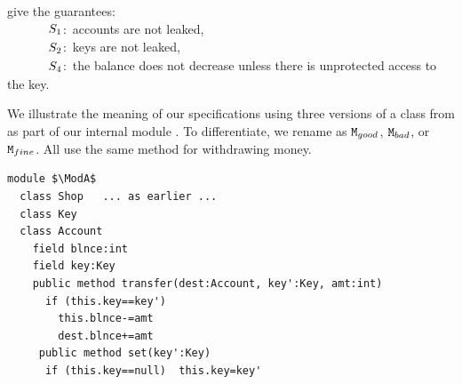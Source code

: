 \noindent
 give the  guarantees:\\
 $\strut  \ \ \ \ \ \ \ \ \ \   S_1$:\   accounts are not leaked, \\
$\strut   \ \ \ \ \ \ \ \ \ \  S_2$:\    keys are not leaked,\\
$\strut \ \ \ \ \ \ \ \ \ \   S_4$:\   the balance does not decrease unless there is unprotected access to the key.  


 
\vspace{.1cm}

\begin{example}
We illustrate the meaning of our specifications  using three  versions of a class   from  \cite{OOPSLA22} 
as part of our internal module \Mshop. 
To differentiate, we rename \Mshop  as $\mbox{\normalfont{\texttt{M}}}_{{good}}$,  $\mbox{\normalfont{\texttt{M}}}_{{bad}}$, or $\mbox{\normalfont{\texttt{M}}}_{{fine}}$. 
All use the same  method for withdrawing money.

%
\begin{lstlisting}[mathescape=true, language=Chainmail, frame=lines]
module $\ModA$      
  class Shop   ... as earlier ...
  class Key
  class Account
    field blnce:int 
    field key:Key
    public method transfer(dest:Account, key':Key, amt:int)
      if (this.key==key')
        this.blnce-=amt
        dest.blnce+=amt
     public method set(key':Key)
      if (this.key==null)  this.key=key'
\end{lstlisting}


\end{example}
